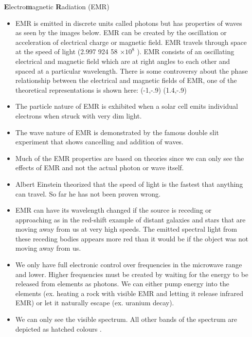 {\Large {\bfseries E}lectro{\bfseries m}agnetic {\bfseries R}adiation (EMR)}
\begin{itemize}
\item EMR is emitted in discrete units called photons but has properties of waves as seen by the images below. EMR can be created by the oscillation or acceleration of electrical charge or magnetic field. EMR travels through space at the speed of light (2.997 924 58 $\times 10^{8}$ \metrepersecond ). EMR consists of an oscillating electrical and magnetic field which are at right angles to each other and spaced at a particular wavelength. There is some controversy about the phase relationship between the electrical and magnetic fields of EMR, one of the theoretical representations is shown here:
\vspace{2.3in}
(-1,-.9){}
(1.4,-.9){}

\item The particle nature of EMR is exhibited when a solar cell emits individual electrons when struck with very dim light.

\item The wave nature of EMR is demonstrated by the famous double slit experiment that shows cancelling and addition of waves.

\item Much of the EMR properties are based on theories since we can only see the effects of EMR and not the actual photon or wave itself.

\item Albert Einstein theorized that the speed of light is the fastest that anything can travel. So far he has not been proven wrong.

\item EMR can have its wavelength changed if the source is receding or approaching as in the red-shift example of distant galaxies and stars that are moving away from us at very high speeds. The emitted spectral light from these receding bodies appears more red than it would be if the object was not moving away from us.

\item We only have full electronic control over frequencies in the microwave range and lower. Higher frequencies must be created by waiting for the energy to be released from elements as photons. We can either pump energy into the elements (ex. heating a rock with visible EMR and letting it release infrared EMR) or let it naturally escape (ex. uranium decay).

\item We can only see the visible spectrum. All other bands of the spectrum are depicted as hatched colours \hspace{0.4in}.


\end{itemize}
